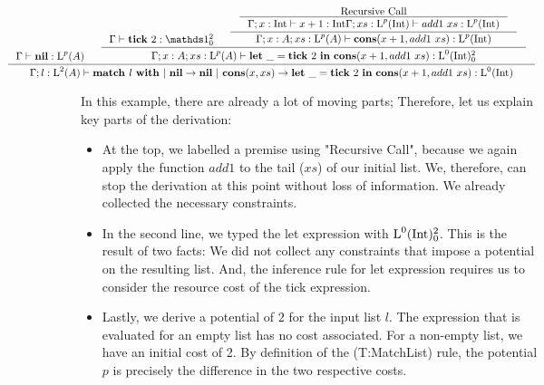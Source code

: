 \[
   \hspace*{-2.5cm}
   \inference
   {
      \typing{\Gamma}{\listnil}{\ralist{p}{A}} 
      &
      \inference
      {
         \typing{\Gamma}{\tick{2}}{\ratype{\unit}{2}{0}}
         &
         \inference
         {
            \inference
            {
               \text{Recursive Call}
            }
            {
               \typing{\Gamma;x:\typeint}{x + 1}{\typeint}
               \typing{\Gamma;xs:\ralist{p}{\typeint}}{add1~xs}{\ralist{p}{\typeint}}
            }
         }
         {
            \typing{\Gamma;x:A;xs:\ralist{p}{A}}{\cons{x + 1}{add1~xs}}{\ralist{p}{\typeint}}
         }
      }
      {
         \typing{\Gamma;x:A;xs:\ralist{p}{A}}{\letexp{\_}{\tick{2}}{\cons{x+1}{add1~xs}}}{\ratype{\ralist{0}{\typeint}}{2}{0}}
      }
   }
   {
      \typing{\Gamma;l : \ralist{2}{A}}{\listmatch{l}{\listnil}{\letexp{\_}{\tick{2}}{\cons{x+1}{add1~xs}}}}{\ralist{0}{\typeint}}
   }
\]

In this example, there are already a lot of moving parts; Therefore, let us explain key parts of the derivation:

\begin{itemize}
   \item At the top, we labelled a premise using "Recursive Call", because we again apply the function \(add1\) to the tail (\(xs\)) of our initial list. We, therefore, can stop the derivation at this point without loss of information. We already collected the necessary constraints.

   \item In the second line, we typed the let expression with \(\text{L}^{0}(\text{Int}) ^{2}_{0}\). This is the result of two facts: We did not collect any constraints that impose a potential on the resulting list. And, the inference rule for let expression requires us to consider the resource cost of the tick expression. 

   \item Lastly, we derive a potential of \(2\) for the input list \(l\). The expression that is evaluated for an empty list has no cost associated. For a non-empty list, we have an initial cost of 2. By definition of the (T:MatchList) rule, the potential \(p\) is precisely the difference in the two respective costs.


















\end{itemize}


